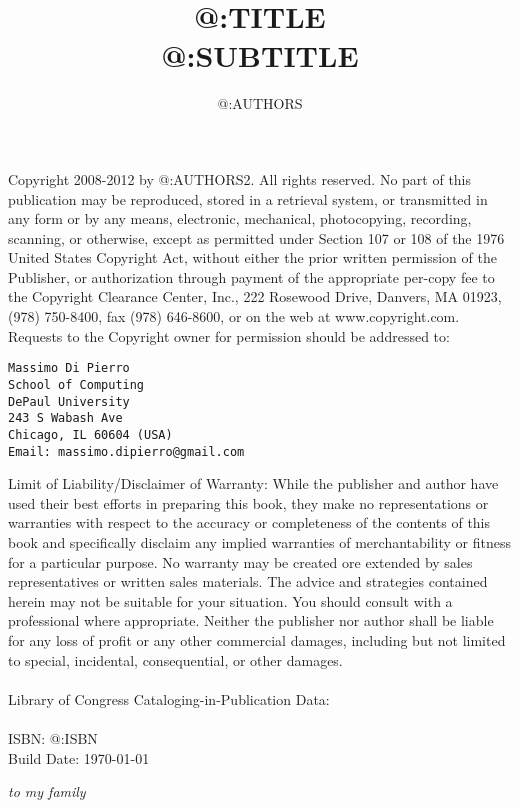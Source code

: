\documentclass[justified,sixbynine,notoc]{tufte-book}
\title{@:TITLE\\{\small @:SUBTITLE}}
\author{@:AUTHORS}
\begin{document}
\frontmatter

\maketitle
\thispagestyle{empty}
\setlength{\parindent}{0pt}
\setlength{\parskip}{2mm}
{\footnotesize
\vskip 1in
Copyright 2008-2012 by @:AUTHORS2. All rights reserved.
\vskip 1cm
No part of this publication may be reproduced, stored in a retrieval
system, or transmitted in any form or by any means, electronic,
mechanical, photocopying, recording, scanning, or otherwise, except
as permitted under Section 107 or 108 of the 1976 United States
Copyright Act, without either the prior written permission of the
Publisher, or authorization through payment of the appropriate
per-copy fee to the Copyright Clearance Center, Inc., 222 Rosewood
Drive, Danvers, MA 01923, (978) 750-8400, fax (978) 646-8600, or on
the web at www.copyright.com. Requests to the Copyright owner for
permission should be addressed to:
\begin{verbatim}
Massimo Di Pierro
School of Computing
DePaul University
243 S Wabash Ave
Chicago, IL 60604 (USA)
Email: massimo.dipierro@gmail.com
\end{verbatim}

Limit of Liability/Disclaimer of Warranty: While the publisher and
author have used their best efforts in preparing this book, they
make no representations or warranties with respect to the accuracy
or completeness of the contents of this book and specifically
disclaim any implied warranties of merchantability or fitness for a
particular purpose.  No warranty may be created ore extended by
sales representatives or written sales materials. 
The advice and strategies contained herein may not be
suitable for your situation. You should consult with a professional
where appropriate.  Neither the publisher nor author shall be liable 
for any loss of profit or any other commercial damages, including
but not limited to special, incidental, consequential, or other damages. \\ \\

Library of Congress Cataloging-in-Publication Data: \\ \\
ISBN: @:ISBN \\
Build Date: \today
}

\newpage
\nohyphenation
\thispagestyle{empty}
\phantom{placeholder}
\vspace{2in}
\hskip 3in
{\it to my family}
\newpage
\thispagestyle{empty}
\phantom {a}
\newpage
\end{document}
